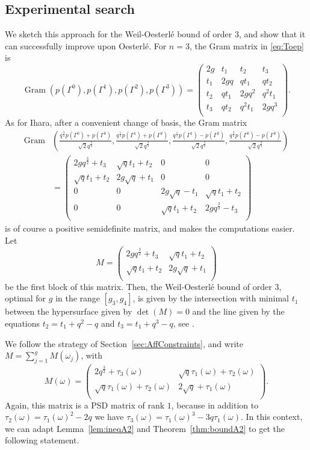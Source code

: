 \documentclass{amsart}
\DeclareMathOperator{\Gram}{Gram}
\begin{document}
\subsection{Experimental search}
We sketch this approach for the Weil-Oesterl\'e bound of order $3$, and show that it can successfully improve upon Oesterl\'e.
For $n=3$, the Gram matrix in \eqref{eq:Toep} is 
\[
\Gram\left(p(\Gamma^0),p(\Gamma^1),p(\Gamma^2),p(\Gamma^3)\right)
=
\begin{pmatrix}
2g & t_1 & t_2 & t_3 \\
t_1 & 2gq & qt_1 & qt_2 \\
t_2 & qt_1 & 2gq^2 & q^2t_1 \\
t_3 & qt_2 & q^2t_1 & 2gq^3 \\
\end{pmatrix}.
\]
As for Ihara, after a convenient change of basis, the Gram matrix 
\begin{align*}
\Gram
&\left(
\frac{q^{\frac{3}{2}} p(\Gamma^0) + p(\Gamma^3)}{\sqrt{2}q^{\frac{3}{4}}},
\frac{q^{\frac{1}{2}} p(\Gamma^1) + p(\Gamma^2)}{\sqrt{2}q^{\frac{3}{4}}},
\frac{q^{\frac{1}{2}} p(\Gamma^1) - p(\Gamma^2)}{\sqrt{2}q^{\frac{3}{4}}},
\frac{q^{\frac{3}{2}} p(\Gamma^0) - p(\Gamma^3)}{\sqrt{2}q^{\frac{3}{4}}}
\right)\\
&=
\begin{pmatrix}
2gq^\frac{3}{2}+t_3 & \sqrt{q}t_1 + t_2 & 0 & 0  \\
\sqrt{q}t_1 + t_2 & 2g\sqrt{q}+t_1 & 0 & 0  \\
0 & 0 & 2g\sqrt{q}-t_1 & \sqrt{q}t_1 + t_2    \\
0 & 0 & \sqrt{q}t_1 + t_2 & 2gq^\frac{3}{2}-t_3   \\
\end{pmatrix} 
\end{align*}
is of course a positive semidefinite matrix, and makes the computations easier.
Let 
\[
M = \begin{pmatrix}
2gq^\frac{3}{2}+t_3 & \sqrt{q}t_1 + t_2   \\
\sqrt{q}t_1 + t_2 & 2g\sqrt{q}+t_1  \\
\end{pmatrix}
\]
be the first block of this matrix.
Then, the Weil-Oesterl\'e bound of order $3$, optimal for $g$ in the range $[g_3,g_4]$, is given by the intersection with minimal $t_1$ between the hypersurface given by $\det(M) = 0$ and the line given by the equations $t_2 = t_1 + q^2- q$ and $t_3 = t_1 + q^3-q$, see \cite{HP19}.  

We follow the strategy of Section~\ref{sec:AffConstraints}, and write $M = \sum_{j=1}^g M(\omega_j)$, with 
\[
M(\omega) = \begin{pmatrix}
2q^\frac{3}{2}+\tau_3(\omega) & \sqrt{q}\tau_1(\omega) + \tau_2(\omega)   \\
\sqrt{q}\tau_1(\omega) + \tau_2(\omega) & 2\sqrt{q}+\tau_1(\omega)  \\
\end{pmatrix}.
\]
Again, this matrix is a PSD matrix of rank $1$, because in addition to $\tau_2(\omega)= \tau_1(\omega)^2 - 2q$ we have $\tau_3(\omega)= \tau_1(\omega)^3 - 3q\tau_1(\omega)$.
In this context, we can adapt Lemma~\ref{lem:ineqA2} and Theorem~\ref{thm:boundA2} to get the following statement.
\end{document}
